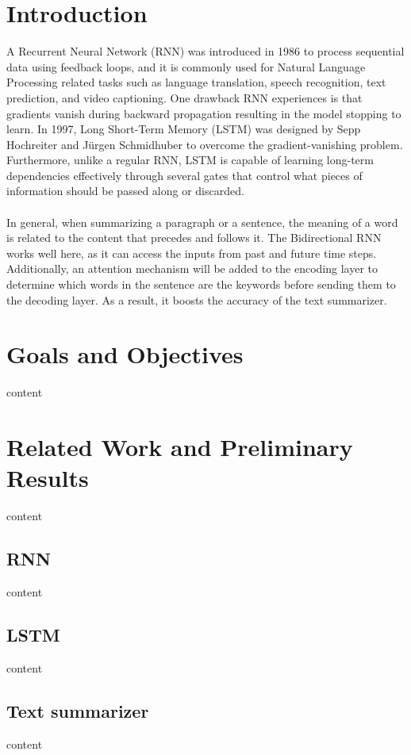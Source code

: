 \documentclass[conference]{IEEEtran}
\begin{document}
\section{Introduction}
A Recurrent Neural Network (RNN) was introduced in 1986 to process sequential data using feedback loops, and it is commonly used for Natural Language Processing related tasks such as language translation, speech recognition, text prediction, and video captioning\cite{LSTM}. One drawback RNN experiences is that gradients vanish during backward propagation resulting in the model stopping to learn. In 1997, Long Short-Term Memory (LSTM) was designed by Sepp Hochreiter and J\"{u}rgen Schmidhuber to overcome the gradient-vanishing problem. Furthermore, unlike a regular RNN, LSTM is capable of learning long-term dependencies effectively through several gates that control what pieces of information should be passed along or discarded. \\ \\
\indent In general, when summarizing a paragraph or a sentence, the meaning of a word is related to the content that precedes and follows it. The Bidirectional RNN works well here, as it can access the inputs from past and future time steps. Additionally, an attention mechanism will be added to the encoding layer to determine which words in the sentence are the keywords before sending them to the decoding layer\cite{AIAYN}. As a result, it boosts the accuracy of the text summarizer.

\section{Goals and Objectives}
content

\section{Related Work and Preliminary Results}
content 
\subsection{RNN}
content
\subsection{LSTM}
content
\subsection{Text summarizer}
content
\end{document}

